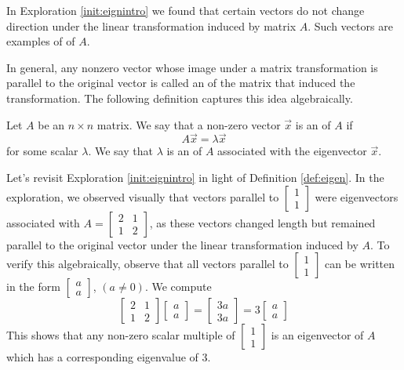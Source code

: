 \documentclass{ximera}
\begin{document}
In Exploration \ref{init:eignintro} we found that certain vectors do not change direction under the linear transformation induced by matrix $A$.  Such vectors are examples of  of $A$.
    
In general, any nonzero vector whose image under a matrix transformation is parallel to the original vector is called an  of the matrix that induced the transformation.  The following definition captures this idea algebraically.
    
\begin{definition}\label{def:eigen}
Let $A$ be an $n \times n$ matrix.  We say that a non-zero vector $\vec{x}$ is an  of $A$ if $$A\vec{x} = \lambda \vec{x}$$
for some scalar $\lambda$.
We say that $\lambda$ is an  of $A$ associated with the eigenvector $\vec{x}$. %
\end{definition}
    
Let's revisit Exploration \ref{init:eignintro} in light of Definition \ref{def:eigen}.  In the exploration, we observed visually that vectors parallel to $\begin{bmatrix} 1\\ 1 \end{bmatrix}$ were eigenvectors associated with $A=\begin{bmatrix} 2& 1\\ 1&2
\end{bmatrix}$, as these vectors changed length but remained parallel to the original vector under the linear transformation induced by $A$.  To verify this algebraically, observe that all vectors parallel to $\begin{bmatrix} 1\\ 1 \end{bmatrix}$ can be written in the form $\begin{bmatrix} a\\ a \end{bmatrix}$, $(a\neq 0)$.  We compute
$$\begin{bmatrix} 2& 1\\ 1&2 \end{bmatrix} \begin{bmatrix} a\\ a \end{bmatrix} =
\begin{bmatrix} 3a\\ 3a \end{bmatrix}= 3 \begin{bmatrix} a\\ a \end{bmatrix}$$
This shows that any non-zero scalar multiple of $\begin{bmatrix} 1\\ 1 \end{bmatrix}$ is an eigenvector of $A$ which has a corresponding eigenvalue of 3.
    
\end{document}
